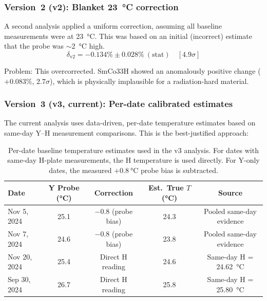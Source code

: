 \documentclass[11pt,letterpaper]{article}
\begin{document}
\subsubsection{Version~2 (v2): Blanket \SI{23}{\celsius} correction}

A second analysis applied a uniform correction, assuming all baseline
measurements were at \SI{23}{\celsius}. This was based on an initial (incorrect)
estimate that the probe was $\sim$\SI{2}{\celsius} high.
\begin{equation*}
    \delta_\mathrm{v2} = -0.134\% \pm 0.028\%~(\mathrm{stat}) \quad [4.9\sigma]
\end{equation*}

Problem: This overcorrected. SmCo33H showed an anomalously positive
change ($+0.083\%$, $2.7\sigma$), which is physically implausible for a
radiation-hard material.

\subsubsection{Version~3 (v3, current): Per-date calibrated estimates}

The current analysis uses data-driven, per-date temperature estimates based on
same-day Y--H measurement comparisons. This is the best-justified approach:

\begin{table}[H]
\centering
\caption{Per-date baseline temperature estimates used in the v3 analysis. For
dates with same-day H-plate measurements, the H temperature is used directly.
For Y-only dates, the measured $+\SI{0.8}{\celsius}$ probe bias is subtracted.}
\label{tab:temp_v3}
\begin{tabular}{@{}lcccc@{}}
\toprule
\textbf{Date} & \textbf{Y Probe (\si{\celsius})} &
\textbf{Correction} & \textbf{Est.\ True $T$ (\si{\celsius})} &
\textbf{Source} \\
\midrule
Nov 5, 2024  & 25.1 & $-0.8$ (probe bias) & 24.3 & Pooled same-day evidence \\
Nov 7, 2024  & 24.6 & $-0.8$ (probe bias) & 23.8 & Pooled same-day evidence \\
Nov 20, 2024 & 25.4 & Direct H reading    & 24.6 & Same-day H = \SI{24.62}{\celsius} \\
Sep 30, 2024 & 26.7 & Direct H reading    & 25.8 & Same-day H = \SI{25.80}{\celsius} \\
\bottomrule
\end{tabular}
\end{table}
\end{document}
